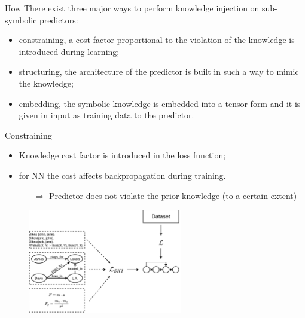 \documentclass[presentation]{beamer}\mode<presentation>{\usetheme{AMSBolognaFC}}
\begin{document}
\begin{frame}[c]{How}
    There exist three major ways to perform knowledge injection on sub-symbolic predictors:
    \begin{itemize}
        \item constraining, a cost factor proportional to the violation of the knowledge is introduced during learning;
        \item structuring, the architecture of the predictor is built in such a way to mimic the knowledge;
        \item embedding, the symbolic knowledge is embedded into a tensor form and it is given in input as training data to the predictor.
   \end{itemize} 
\end{frame}

\begin{frame}[c]{Constraining}
    \begin{itemize}
        \item Knowledge cost factor is introduced in the loss function;
        \item for NN the cost affects backpropagation during training.
        \begin{itemize}
            \item[$\Rightarrow$] Predictor does not violate the prior knowledge (to a certain extent)
        \end{itemize} 
    \end{itemize}
    
    \begin{figure}
        \centering
        \includegraphics[width=0.6\textwidth]{figures/ski-constraining}
    \end{figure}
\end{frame}
\end{document}
